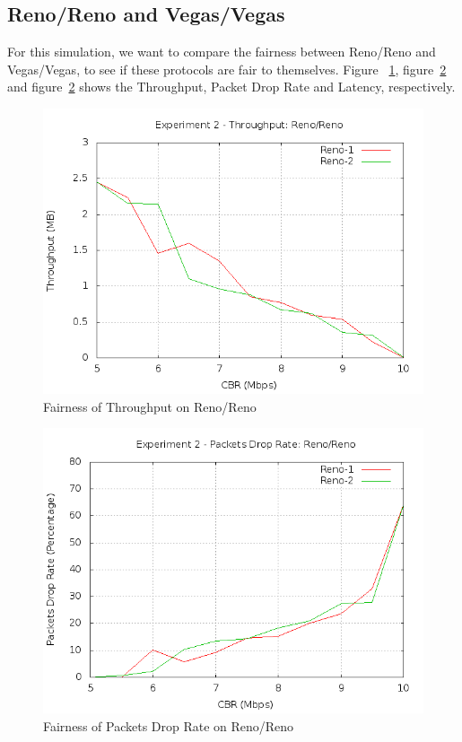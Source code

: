 \documentclass[10pt, conference]{lib/IEEEtran}
\begin{document}
\subsection{Reno/Reno and Vegas/Vegas}
For this simulation, we want to compare the fairness between Reno/Reno and Vegas/Vegas,
to see if these protocols are fair to themselves. Figure ~\ref{fig:exp2_thp_rr}, figure~\ref{fig:exp2_dr_rr} and figure~\ref{fig:exp2_dr_rr} shows the Throughput, Packet Drop Rate and Latency, respectively.
\begin{figure}[H]
    \centering
    \includegraphics[width=0.9\linewidth]{plot/exp2-thp-Reno-Reno.png}
    \caption{Fairness of Throughput on Reno/Reno}
    \label{fig:exp2_thp_rr}
\end{figure}
\begin{figure}[H]
    \centering
    \includegraphics[width=0.9\linewidth]{plot/exp2-dr-Reno-Reno.png}
    \caption{Fairness of Packets Drop Rate on Reno/Reno}
    \label{fig:exp2_dr_rr}
\end{figure}
\end{document}

